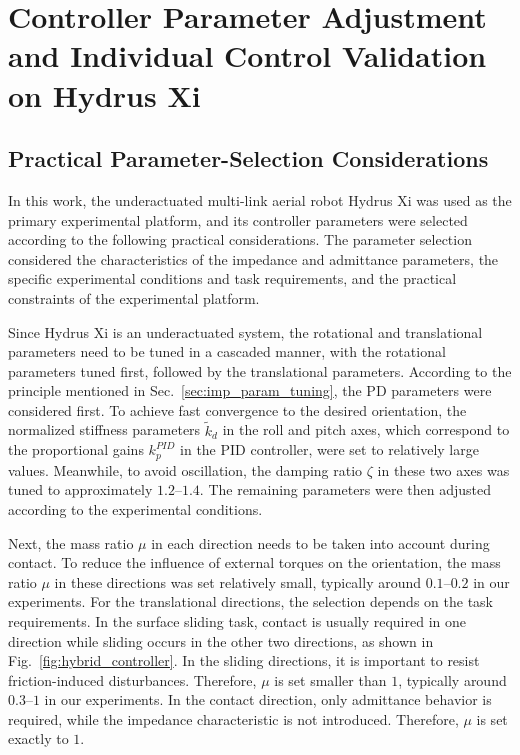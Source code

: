 \section{Controller Parameter Adjustment and Individual Control Validation on Hydrus Xi}
\subsection{Practical Parameter-Selection Considerations}
\label{sec:parameter_selection}

In this work, the underactuated multi-link aerial robot Hydrus Xi was used as the primary experimental platform, and its controller parameters were selected according to the following practical considerations. The parameter selection considered the characteristics of the impedance and admittance parameters, the specific experimental conditions and task requirements, and the practical constraints of the experimental platform.

Since Hydrus Xi is an underactuated system, the rotational and translational parameters need to be tuned in a cascaded manner, with the rotational parameters tuned first, followed by the translational parameters. According to the principle mentioned in Sec.~\ref{sec:imp_param_tuning}, the PD parameters were considered first. To achieve fast convergence to the desired orientation, the normalized stiffness parameters $\tilde{k}_d$ in the roll and pitch axes, which correspond to the proportional gains $k_p^{PID}$ in the PID controller, were set to relatively large values. Meanwhile, to avoid oscillation, the damping ratio $\zeta$ in these two axes was tuned to approximately $1.2$--$1.4$. The remaining parameters were then adjusted according to the experimental conditions.

Next, the mass ratio $\mu$ in each direction needs to be taken into account during contact. To reduce the influence of external torques on the orientation, the mass ratio $\mu$ in these directions was set relatively small, typically around $0.1$--$0.2$ in our experiments. For the translational directions, the selection depends on the task requirements. In the surface sliding task, contact is usually required in one direction while sliding occurs in the other two directions, as shown in Fig.~\ref{fig:hybrid_controller}. In the sliding directions, it is important to resist friction-induced disturbances. Therefore, $\mu$ is set smaller than $1$, typically around $0.3$--$1$ in our experiments. In the contact direction, only admittance behavior is required, while the impedance characteristic is not introduced. Therefore, $\mu$ is set exactly to $1$.

